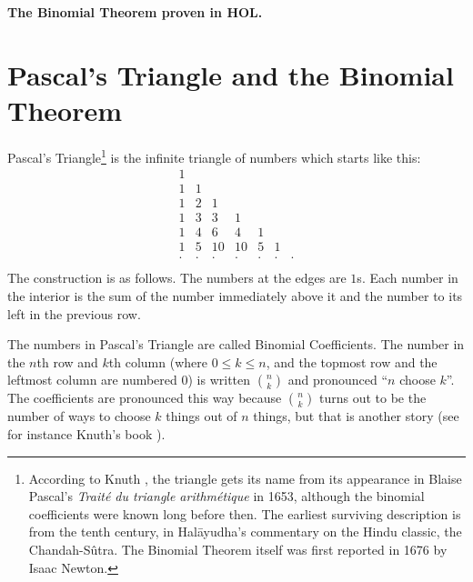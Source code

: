 
\setlength{\unitlength}{1mm}
\vskip10mm
\begin{center}\LARGE\bf
The Binomial Theorem proven in HOL.
\end{center}
\vskip10mm

\def\obj#1{\mbox{\tt#1}}

%

\section{Pascal's Triangle and the Binomial Theorem}

Pascal's Triangle\footnote{
According to Knuth \cite{knuth73}, the triangle gets its name from
its appearance in Blaise Pascal's {\em Trait\'e du triangle arithm\'etique}
in 1653, although the binomial coefficients were known long before then.
The earliest surviving description is from the tenth century,
in Hal\={a}yudha's commentary on the Hindu classic, the Chandah-S\^{u}tra.
The Binomial Theorem itself was first reported in 1676 by Isaac Newton.
}
is the infinite triangle of numbers which starts like this:
\[\begin{array}{ccccccc}
1  \\
1 & 1 \\
1 & 2 & 1 \\
1 & 3 & 3 & 1 \\
1 & 4 & 6 & 4 & 1 \\
1 & 5 & 10 & 10 & 5 & 1 \\
\cdot & \cdot & \cdot & \cdot & \cdot & \cdot & \cdot \\
\end{array}\]
The construction is as follows. The numbers at the edges 
are $1$s. Each number in the interior is the sum of the number immediately 
above it and the number to its left in the previous row.

The numbers in Pascal's Triangle are called Binomial Coefficients. 
The number in the $n$th row and $k$th column (where $0 \leq k \leq n$, and the 
topmost row and the leftmost column are numbered $0$) is written 
$n \choose k$ and pronounced ``$n$ choose $k$''.  The coefficients are 
pronounced this way because $n \choose k$ turns out to be the number of 
ways to choose $k$ things out of $n$ things, but that is another story
(see for instance Knuth's book \cite{knuth73}).

